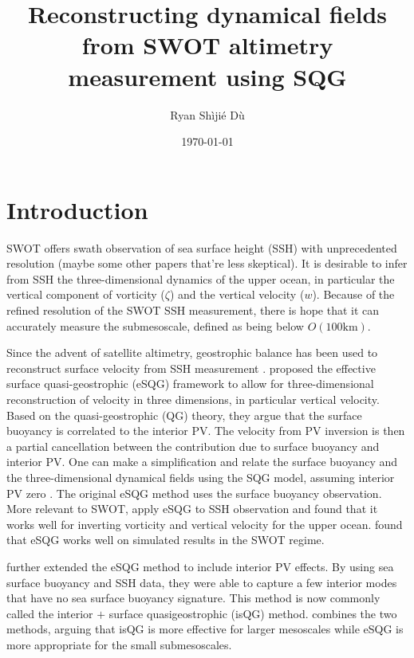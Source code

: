 \documentclass[11pt,letterpaper]{article}
\title{Reconstructing dynamical fields from SWOT altimetry measurement using SQG\pl}
\author{Ryan Sh\`iji\'e D\`u}
\date{\today}
\begin{document}



\maketitle

\section{Introduction}
SWOT offers swath observation of sea surface height (SSH) with unprecedented resolution \citep{CalliesWu_19,Chelton_24} (maybe some other papers that're less skeptical). It is desirable to infer from SSH the three-dimensional dynamics of the upper ocean, in particular the vertical component of vorticity ($\zeta$) and the vertical velocity ($w$). Because of the refined resolution of the SWOT SSH measurement, there is hope that it can accurately measure the submesoscale, defined as being below $O(100 \text{km})$. 

Since the advent of satellite altimetry, geostrophic balance has been used to reconstruct surface velocity from SSH measurement \citep{Stammer_97}. \cite{LapeyreKlein_06} proposed the effective surface quasi-geostrophic (eSQG) framework to allow for three-dimensional reconstruction of velocity in three dimensions, in particular vertical velocity. Based on the quasi-geostrophic (QG) theory, they argue that the surface buoyancy is correlated to the interior PV. The velocity from PV inversion is then a partial cancellation between the contribution due to surface buoyancy and interior PV. One can make a simplification and relate the surface buoyancy and the three-dimensional dynamical fields using the SQG model, assuming interior PV zero \citep{Blumen_78,Johnson_78}. The original eSQG method uses the surface buoyancy observation. More relevant to SWOT, \cite{KleinEtAl_09} apply eSQG to SSH observation and found that it works well for inverting vorticity and vertical velocity for the upper ocean. \cite{CarliEtAl_24} found that eSQG works well on simulated results in the SWOT regime.

\cite{WangEtAl_13} further extended the eSQG method to include interior PV effects. By using sea surface buoyancy and SSH data, they were able to capture a few interior modes that have no sea surface buoyancy signature. This method is now commonly called the interior $+$ surface quasigeostrophic (isQG) method. 
\cite{LiuEtAl_19} combines the two methods, arguing that isQG is more effective for larger mesoscales while eSQG is more appropriate for the small submesoscales. 
\end{document}
